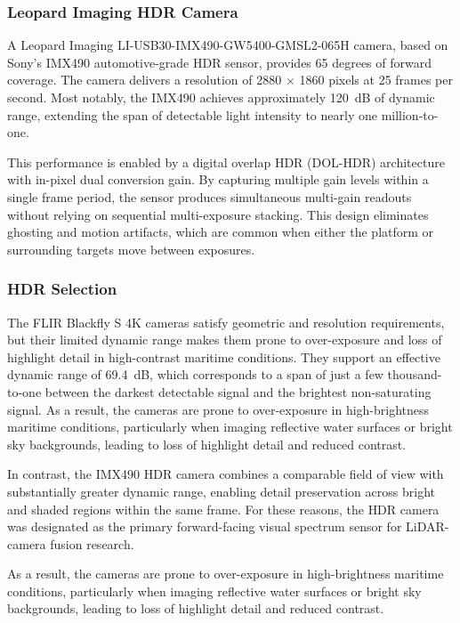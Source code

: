 \documentclass{erauthesis}
\begin{document}
\subsubsection{Leopard Imaging HDR Camera} \label{sensors_HDR}

A Leopard Imaging LI-USB30-IMX490-GW5400-GMSL2-065H camera, based on Sony’s IMX490 automotive-grade \ac{HDR} sensor, provides 65 degrees of forward coverage.  
The camera delivers a resolution of 2880 $\times$ 1860 pixels at 25 frames per second.  
Most notably, the IMX490 achieves approximately 120~dB of dynamic range, extending the span of detectable light intensity to nearly one million-to-one.  

This performance is enabled by a digital overlap \ac{HDR} (DOL-HDR) architecture with in-pixel dual conversion gain.  
By capturing multiple gain levels within a single frame period, the sensor produces simultaneous multi-gain readouts without relying on sequential multi-exposure stacking.  
This design eliminates ghosting and motion artifacts, which are common when either the platform or surrounding targets move between exposures.  

\subsubsection{HDR Selection}

The FLIR Blackfly S 4K cameras satisfy geometric and resolution requirements, but their limited dynamic range makes them prone to over-exposure and loss of highlight detail in high-contrast maritime conditions. 
They support an effective dynamic range of 69.4~dB, which corresponds to a span of just a few thousand-to-one between the darkest detectable signal and the brightest non-saturating signal. 
As a result, the cameras are prone to over-exposure in high-brightness maritime conditions, particularly when imaging reflective water surfaces or bright sky backgrounds, leading to loss of highlight detail and reduced contrast. 

In contrast, the IMX490 \ac{HDR} camera combines a comparable field of view with substantially greater dynamic range, enabling detail preservation across bright and shaded regions within the same frame.  
For these reasons, the \ac{HDR} camera was designated as the primary forward-facing visual spectrum sensor for \ac{LiDAR}-camera fusion research.  
 
As a result, the cameras are prone to over-exposure in high-brightness maritime conditions, particularly when imaging reflective water surfaces or bright sky backgrounds, leading to loss of highlight detail and reduced contrast.  
\end{document}
